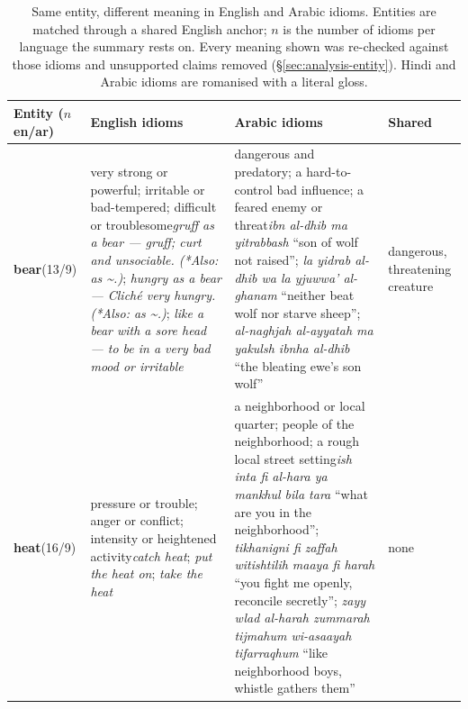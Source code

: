 \begin{table}[t]
\centering
\footnotesize
\setlength{\tabcolsep}{4pt}
\renewcommand{\arraystretch}{1.12}
\caption{Same entity, different meaning in \textcolor{encolor}{English} and \textcolor{zhcolor}{Arabic} idioms. Entities are matched through a shared English anchor; $n$ is the number of idioms per language the summary rests on. Every meaning shown was re-checked against those idioms and unsupported claims removed (\S\ref{sec:analysis-entity}). Hindi and Arabic idioms are romanised with a literal gloss. }
\label{tab:entity-cases-enar}
\begin{tabular}{@{}p{}p{}p{}p{}@{}}
\toprule
Entity ($n$ en/ar) & \textcolor{encolor}{English idioms} & \textcolor{zhcolor}{Arabic idioms} & Shared \\
\midrule
\textbf{bear}\newline (13/9)
& \textcolor{encolor}{very strong or powerful; irritable or bad-tempered; difficult or troublesome}\newline \textit{gruff as a bear — gruff; curt and unsociable. (*Also: as \textasciitilde{}.)}; \textit{hungry as a bear — Cliché very hungry. (*Also: as \textasciitilde{}.)}; \textit{like a bear with a sore head — to be in a very bad mood or irritable}
& \textcolor{zhcolor}{dangerous and predatory; a hard-to-control bad influence; a feared enemy or threat}\newline \textit{ibn al-dhib ma yitrabbash} ``son of wolf not raised''; \textit{la yidrab al-dhib wa la yjuwwa' al-ghanam} ``neither beat wolf nor starve sheep''; \textit{al-naghjah al-ayyatah ma yakulsh ibnha al-dhib} ``the bleating ewe's son wolf''
& dangerous, threatening creature \\
\textbf{heat}\newline (16/9)
& \textcolor{encolor}{pressure or trouble; anger or conflict; intensity or heightened activity}\newline \textit{catch heat}; \textit{put the heat on}; \textit{take the heat}
& \textcolor{zhcolor}{a neighborhood or local quarter; people of the neighborhood; a rough local street setting}\newline \textit{ish inta fi al-hara ya mankhul bila tara} ``what are you in the neighborhood''; \textit{tikhanigni fi zaffah witishtilih maaya fi harah} ``you fight me openly, reconcile secretly''; \textit{zayy wlad al-harah zummarah tijmahum wi-asaayah tifarraqhum} ``like neighborhood boys, whistle gathers them''
& none \\

\end{tabular}
\end{table}
